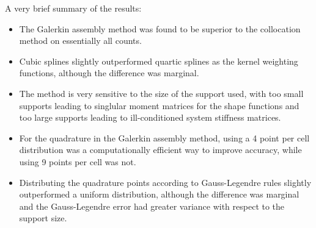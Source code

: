 \documentclass{article}
\begin{document}
A very brief summary of the results:

\begin{itemize}
\item The Galerkin assembly method was found to be superior to the collocation method on essentially all counts.
\item Cubic splines slightly outperformed quartic splines as the kernel weighting functions, although the difference was marginal.
\item The method is very sensitive to the size of the support used, with too small supports leading to singlular moment matrices for the shape functions and too large supports leading to ill-conditioned system stiffness matrices.
\item For the quadrature in the Galerkin assembly method, using a 4 point per cell distribution was a computationally efficient way to improve accuracy, while using 9 points per cell was not.
\item Distributing the quadrature points according to Gauss-Legendre rules slightly outperformed a uniform distribution, although the difference was marginal and the Gauss-Legendre error had greater variance with respect to the support size.
\end{itemize}
\end{document}
